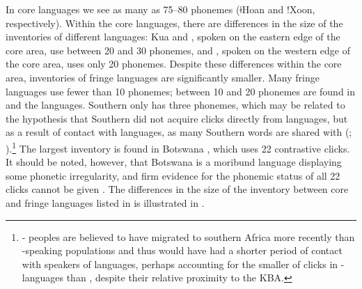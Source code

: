 \documentclass[output=paper
,newtxmath
,modfonts
,nonflat]{langsci/langscibook}
\begin{document}
In core languages we see as many as 75–80  phonemes (ǂHoan and !Xoon, respectively). Within the core languages, there are differences in the size of the  inventories of different languages: Kua and , spoken on the eastern edge of the core area, use between 20 and 30  phonemes, and , spoken on the western edge of the core area, uses only 20  phonemes. Despite these differences within the core area,  inventories of fringe languages are significantly smaller. Many fringe languages use fewer than 10  phonemes; between 10 and 20  phonemes are found in  and the  languages. Southern  only has three  phonemes, which may be related to the hypothesis that Southern  did not acquire clicks directly from  languages, but as a result of contact with  languages, as many Southern   words are shared with  (\citealt{bourquin1951}; \citealt[23]{Doke1957}).\footnote{- peoples are believed to have migrated to southern Africa more recently than -speaking populations \citep[31]{Pakendorf2017} and thus would have had a shorter period of contact with speakers of  languages, perhaps accounting for the smaller  of clicks in - languages than , despite their relative proximity to the KBA.} The largest  inventory is found in Botswana , which uses 22 contrastive clicks. It should be noted, however, that Botswana  is a moribund language displaying some phonetic irregularity, and firm evidence for the phonemic status of all 22 clicks cannot be given \citep{Fulop2003}. The differences in the size of the  inventory between core and fringe languages listed in  is illustrated in . 
\end{document}
